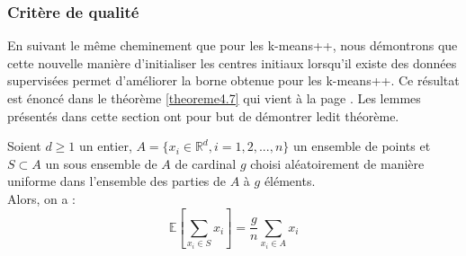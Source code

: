 \documentclass[12pt,a4paper]{book}
\newcommand{\R}{\mathbb{R}}
\newcommand{\E}{\mathbb{E}}
\newcommand{\1}{\mathds{1}}
\begin{document}
\subsubsection{Critère de qualité}

En suivant le même cheminement que pour les k-means++, nous démontrons que cette nouvelle manière d'initialiser les centres initiaux lorsqu'il existe des données supervisées permet d'améliorer la borne obtenue pour les k-means++. Ce résultat est énoncé dans le théorème \ref{theoreme4.7} qui vient à la page \pageref{theoreme4.7}. Les lemmes présentés dans cette section ont pour but de démontrer ledit théorème.

	\begin{env_lemme}\label{lemme4.3}
		Soient $d \geq 1$ un entier, $A = \{ x_i \in \R^d, i=1,2, ..., n \}$ un ensemble de points et $S \subset A$ un sous ensemble de $A$ de cardinal $g$ choisi aléatoirement de manière uniforme dans l'ensemble des parties de $A$ à $g$ éléments.\\
		Alors, on a :
		$$
			\E \left[ \sum_{x_i \in S} x_i \right] = \frac{g}{n} \sum_{x_i \in A} x_i
		$$		
	\end{env_lemme}	
	
\end{document}
